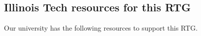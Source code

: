 \documentclass[11pt]{NSFamsart}
\begin{document}

   







  

\iffalse 
\subsection*{Illinois Tech resources  for this RTG}
Our university has the following resources to support this RTG.
\end{document}
